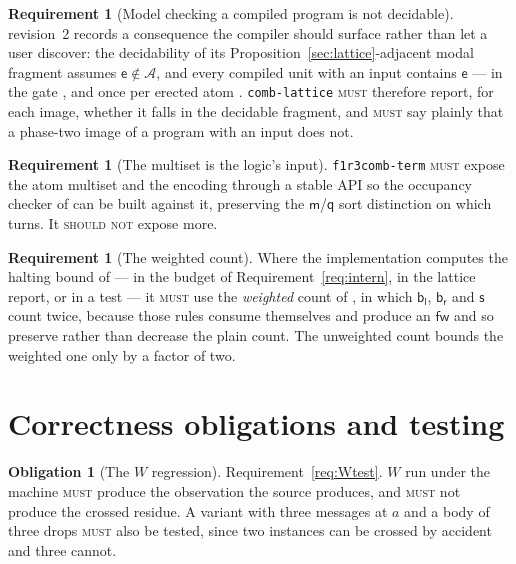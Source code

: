 \documentclass[11pt,a4paper]{article}
\newcommand{\code}[1]{\texttt{#1}}
\newcommand{\MUST}{\textsc{must}}
\newcommand{\SHOULDNOT}{\textsc{should not}}
\newcommand{\mm}{\mathsf{m}}
\newcommand{\fw}{\mathsf{fw}}
\newcommand{\bl}{\mathsf{b}_{\mathsf{l}}}
\newcommand{\br}{\mathsf{b}_{\mathsf{r}}}
\newcommand{\sy}{\mathsf{s}}
\newcommand{\ev}{\mathsf{e}}
\newcommand{\qq}{\mathsf{q}}
\newcommand{\Atm}{\mathcal{A}}
\theoremstyle{definition}
\newtheorem{requirement}[definition]{Requirement}
\newtheorem{obligation}[definition]{Obligation}
\theoremstyle{plain}
\begin{document}
\begin{requirement}[Model checking a compiled program is not decidable]
\label{req:mcundec}
\cite{logic} revision~2 records a consequence the compiler should surface
rather than let a user discover: the decidability of its
Proposition~\ref{sec:lattice}-adjacent modal fragment assumes
$\ev \notin \Atm$, and every compiled unit with an input contains $\ev$ ---
in the gate \cite[Lem.~6.2]{draft3}, and once per erected atom
\cite[Rem.~3.11]{draft3}. \code{comb-lattice} \MUST{} therefore report, for
each image, whether it falls in the decidable fragment, and \MUST{} say
plainly that a phase-two image of a program with an input does not.
\end{requirement}

\begin{requirement}[The multiset is the logic's input]\label{req:logicinput}
\code{f1r3comb-term} \MUST{} expose the atom multiset and the encoding through
a stable API so the occupancy checker of \cite[\S6]{logic} can be built
against it, preserving the $\mm$/$\qq$ sort distinction on which
\cite[Rem.~2.5]{logic} turns. It \SHOULDNOT{} expose more.
\end{requirement}

\begin{requirement}[The weighted count]\label{req:weighted}
Where the implementation computes the halting bound of
\cite[Prop.~9.9]{draft3} --- in the budget of Requirement~\ref{req:intern}, in
the lattice report, or in a test --- it \MUST{} use the \emph{weighted} count
of \cite[Def.~6.6]{logic}, in which $\bl$, $\br$ and $\sy$ count twice,
because those rules consume themselves and produce an $\fw$ and so preserve
rather than decrease the plain count. The unweighted count bounds the weighted
one only by a factor of two.
\end{requirement}

\section{Correctness obligations and testing}\label{sec:test}

\begin{obligation}[The $W$ regression]\label{obl:W}
Requirement~\ref{req:Wtest}. $W$ run under the machine \MUST{} produce the
observation the source produces, and \MUST{} not produce the crossed residue.
A variant with three messages at $a$ and a body of three drops \MUST{} also be
tested, since two instances can be crossed by accident and three cannot.
\end{obligation}
\end{document}
